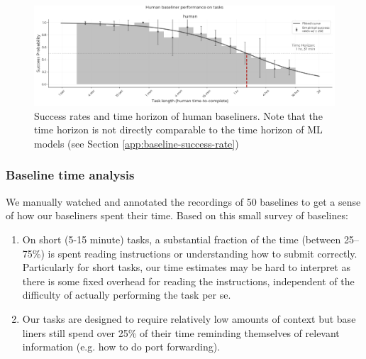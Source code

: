\documentclass{article}
\begin{document}
\begin{figure}
    \centering
    \includegraphics[width=\linewidth]{plots/individual_histograms/human_baselines/histograms.png}
    \caption{Success rates and time horizon of human baseliners. Note that the time horizon is not directly comparable to the time horizon of ML models (see Section \ref{app:baseline-success-rate})}
    \label{fig:human-histogram}
\end{figure}


\subsubsection{Baseline time analysis}
\label{app:baseline-time}
We manually watched and annotated the recordings of 50 baselines to get a sense of how our baseliners spent their time. Based on this small survey of baselines: 
\begin{enumerate}
    \item On short (5-15 minute) tasks, a substantial fraction of the time (between 25--75\%) is spent reading instructions or understanding how to submit correctly. Particularly for short tasks, our time estimates may be hard to interpret as there is some fixed overhead for reading the instructions, independent of the difficulty of actually performing the task per se.
    \item Our tasks are designed to require relatively low amounts of context but base liners still spend over 25\% of their time reminding themselves of relevant information (e.g. how to do port forwarding).
\end{enumerate}


\end{document}
